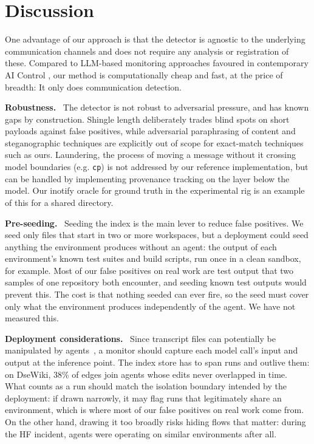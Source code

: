 \documentclass[11pt,a4paper]{article}
\newcommand{\lead}[1]{\textbf{#1}\ }
\begin{document}
\section{Discussion}\label{sec:discussion}

One advantage of our approach is that the detector is agnostic to the underlying communication channels and does not require any analysis or registration of these. Compared to LLM-based monitoring approaches favoured in contemporary AI Control \cite{jotautaite2026}, our method is computationally cheap and fast, at the price of breadth: It only does communication detection.

\lead{Robustness.} The detector is not robust to adversarial pressure, and has known gaps by construction. Shingle length deliberately trades blind spots on short payloads against false positives, while adversarial paraphrasing of content and steganographic techniques are explicitly out of scope for exact-match techniques such as ours. Laundering, the process of moving a message without it crossing model boundaries (e.g. \texttt{cp}) is not addressed by our reference implementation, but can be handled by implementing provenance tracking on the layer below the model. Our inotify oracle for ground truth in the experimental rig is an example of this for a shared directory.

\lead{Pre-seeding.} Seeding the index is the main lever to reduce false positives. We seed only files that start in two or more workspaces, but a deployment could seed anything the environment produces without an agent: the output of each environment's known test suites and build scripts, run once in a clean sandbox, for example. Most of our false positives on real work are test output that two samples of one repository both encounter, and seeding known test outputs would prevent this. The cost is that nothing seeded can ever fire, so the seed must cover only what the environment produces independently of the agent. We have not measured this.

\lead{Deployment considerations.} Since transcript files can potentially be manipulated by agents~\cite{metr2026}, a monitor should capture each model call's input and output at the inference point. The index store has to span runs and outlive them: on DseWiki, 38\% of edges join agents whose edits never overlapped in time. What counts as a run should match the isolation boundary intended by the deployment: if drawn narrowly, it may flag runs that legitimately share an environment, which is where most of our false positives on real work come from. On the other hand, drawing it too broadly risks hiding flows that matter: during the HF incident, agents were operating on similar environments after all.
\end{document}
